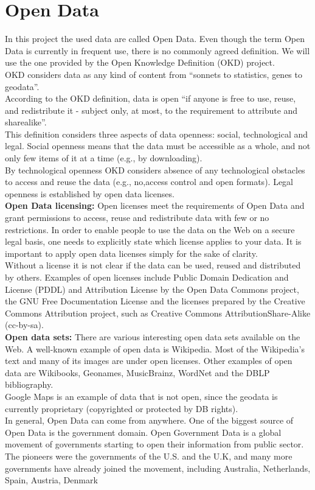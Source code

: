 \documentclass[a4paper,12pt,oneside]{report}
\begin{document}
{{{\section{Open Data}
{In this project the used data are called Open Data. Even though the term Open Data is currently in frequent use, there is no commonly agreed definition. We will use the one provided by the Open Knowledge Definition (OKD) project.\\
OKD considers data as any kind of content from “sonnets to statistics, genes to geodata”.\\
 According to the OKD definition, data is open “if anyone is free to use, reuse, and redistribute it - subject only, at most, to the requirement to attribute and sharealike”.\\
 This definition considers three aspects of data openness: social, technological and legal. Social openness means that the data must be accessible as a whole, and not only few items of it at a time (e.g., by downloading).\\
 By technological openness OKD considers absence of any technological obstacles to access and reuse the data (e.g., no,access control and open formats). Legal openness is established by open data licenses.\\
\textbf{Open Data licensing:} Open licenses meet the requirements of Open Data and grant permissions to access, reuse and redistribute data with few or no restrictions. In order to enable people to use the data on the Web on a secure legal basis, one needs to
explicitly state which license applies to your data. It is important to apply open data licenses simply for the sake of clarity. \\
Without a license it is not clear if the data can be used, reused and distributed by others. Examples of open licenses include Public Domain Dedication and License (PDDL) and Attribution License by the Open Data Commons project, the GNU Free Documentation License and the licenses prepared by the Creative Commons Attribution project, such as Creative Commons AttributionShare-Alike (cc-by-sa).\\
\textbf{Open data sets:} There are various interesting open data sets available on the Web. A well-known example of open data is Wikipedia. Most of the Wikipedia’s text and many of its images are under open licenses. Other examples of open data are Wikibooks, Geonames, MusicBrainz, WordNet and the DBLP bibliography. \\
Google Maps is an example of data that is not open, since the geodata is currently proprietary (copyrighted or protected by DB rights).\\
In general, Open Data can come from anywhere. One of the biggest source of Open Data is the government domain. Open Government Data is a global movement of governments starting to open their information from public sector.
The pioneers were the governments of the U.S.  and the U.K, and many more governments have already joined the movement, including Australia, Netherlands, Spain, Austria, Denmark}
}}}
\end{document}
